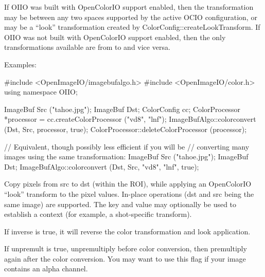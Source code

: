 If OIIO was built with OpenColorIO support enabled, then the transformation
may be between any two spaces supported by the active OCIO configuration, or
may be a ``look'' transformation created by {\cf
ColorConfig::createLookTransform}.  If OIIO was not built with OpenColorIO
support enabled, then the only transformations available are from 
to  and vice versa.

\smallskip
\noindent Examples:
\begin{code}
    #include <OpenImageIO/imagebufalgo.h>
    #include <OpenImageIO/color.h>
    using namespace OIIO;

    ImageBuf Src ("tahoe.jpg");
    ImageBuf Dst;
    ColorConfig cc;
    ColorProcessor *processor = cc.createColorProcessor ("vd8", "lnf");
    ImageBufAlgo::colorconvert (Dst, Src, processor, true);
    ColorProcessor::deleteColorProcessor (processor);

    // Equivalent, though possibly less efficient if you will be
    // converting many images using the same transformation:
    ImageBuf Src ("tahoe.jpg");
    ImageBuf Dst;
    ImageBufAlgo::colorconvert (Dst, Src, "vd8", "lnf", true);
\end{code}
\apiend

 
Copy pixels from {\cf src} to {\cf dst} (within the ROI), while
applying an OpenColorIO ``look'' transform to the pixel values.
In-place operations ({\cf dst} and {\cf src} being the same image)
are supported.  The {\cf key} and {\cf value} may optionally be used
to establish a context (for example, a shot-specific transform).

If {\cf inverse} is {\cf true}, it will reverse the color transformation
and look application.

If {\cf unpremult} is {\cf true}, unpremultiply before color conversion,
then premultiply again after the color conversion.  You may want to use
this flag if your image contains an alpha channel.

